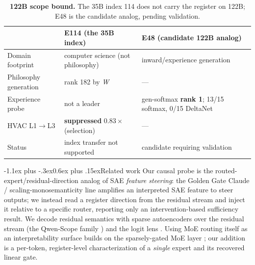 \documentclass[10pt]{article}
\makeatletter
\renewcommand\section{\@startsection{section}{1}{\z@}%
  {-1.1ex plus -.3ex}{0.6ex plus .15ex}{\normalfont\large\bfseries}}
\newcommand{\W}{\textit{W}}
\makeatother
\begin{document}
\begin{table}[t]
\centering\small
\setlength{\tabcolsep}{6pt}
\begin{tabular}{@{}lll@{}}
\toprule
& \textbf{E114 (the 35B index)} & \textbf{E48 (candidate 122B analog)} \\
\midrule
Domain footprint & computer science (not philosophy) & inward/experience generation \\
Philosophy generation & rank 182 by \W & --- \\
Experience probe & not a leader & gen-softmax \textbf{rank 1}; 13/15 softmax, 0/15 DeltaNet \\
HVAC L1$\rightarrow$L3 & \textbf{suppressed} $0.83\times$ (selection) & --- \\
Status & index transfer not supported & candidate requiring validation \\
\bottomrule
\end{tabular}
\caption{\textbf{122B scope bound.} The 35B index 114 does not carry the register
on 122B; E48 is the candidate analog, pending validation.}
\label{tab:transfer}
\vspace{-1.4em}
\end{table}

\vspace{-0.4em}
\section{Related work}
\vspace{-0.2em}
Our causal probe is the routed-expert/residual-direction analog of SAE
\emph{feature steering}: the Golden Gate Claude / scaling-monosemanticity line
\cite{templeton2024,ggc2024} amplifies an interpreted SAE feature to steer
outputs; we instead read a register direction from the residual stream and inject
it relative to a specific router, reporting only an intervention-based
sufficiency result.
We decode residual semantics with sparse autoencoders \cite{templeton2024} over
the residual stream (the Qwen-Scope family \cite{qwenscope}) and the logit
lens \cite{logitlens}. Using MoE routing itself as an interpretability surface
builds on the sparsely-gated MoE layer \cite{shazeer2017}; our addition is a
per-token, register-level characterization of a \emph{single} expert and its
recovered linear gate.

\vspace{-0.4em}
\end{document}
